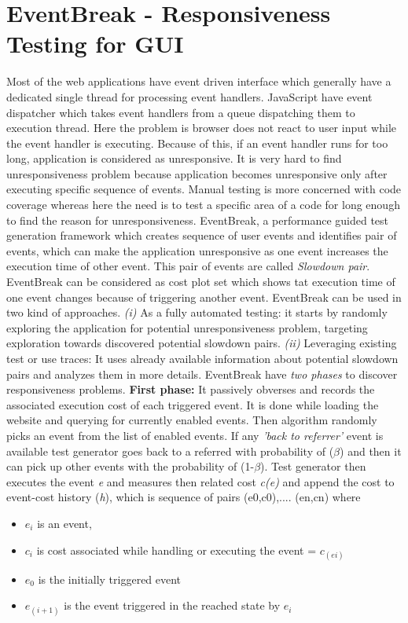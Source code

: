 \documentclass[authoryear,preprint, twocolumn]{sigplanconf}
\begin{document}
\section{EventBreak - Responsiveness Testing for GUI}
\label{sec:eventbreak}
Most of the web applications have event driven interface which generally have a dedicated single thread for processing event handlers. JavaScript have event dispatcher which takes event handlers from a queue dispatching them to execution thread. Here the problem is browser does not react to user input while the event handler is executing. Because of this, if an event handler runs for too long, application is considered as unresponsive. 
\newline It is very hard to find unresponsiveness problem because application becomes unresponsive only after executing specific sequence of events. Manual testing is more concerned with code coverage whereas here the need is to test a specific area of a code for long enough to find the  reason for unresponsiveness.
\newline EventBreak, a performance guided test generation framework which creates sequence of user events and identifies pair of events, which can make the application unresponsive as one event increases the execution time of other event. This pair of events are called \emph{Slowdown pair}. EventBreak can be considered as cost plot set which shows tat execution time of one event changes because of triggering another event.
\newline EventBreak can be used in two kind of approaches. \emph{(i)} As a fully automated testing: it starts by randomly exploring the application for potential unresponsiveness problem, targeting exploration towards discovered potential slowdown pairs. \emph{(ii)} Leveraging existing test or use traces: It uses already available information about potential slowdown pairs and analyzes them in more details.
\newline EventBreak have \emph{two phases} to discover responsiveness problems. 
\newline \textbf{First phase:} It passively obverses and records the associated execution cost of each triggered event. It is done while loading the website and querying for currently enabled events. Then algorithm randomly picks an event from the list of enabled events. If any \emph{'back to referrer'} event is available test generator goes back to a referred with probability of ($\beta$) and then it can pick up other events with the probability of (1-$\beta$). Test generator then executes the event \emph{e} and measures then related cost \emph{c(e)} and append the cost to event-cost history (\emph{h}), which is sequence of pairs (e0,c0),.... (en,cn) where 
\begin{itemize}
	\item \emph{$e_i$} is an event,
	\item \emph{$c_i$} is cost associated while handling or executing the event = \emph{$c_{(ei)}$}
	\item \emph{$e_0$} is the initially triggered event
	\item \emph{$e_{(i+1)}$} is the event triggered in the reached state by \emph{$e_i$}
\end{itemize}
\end{document}
